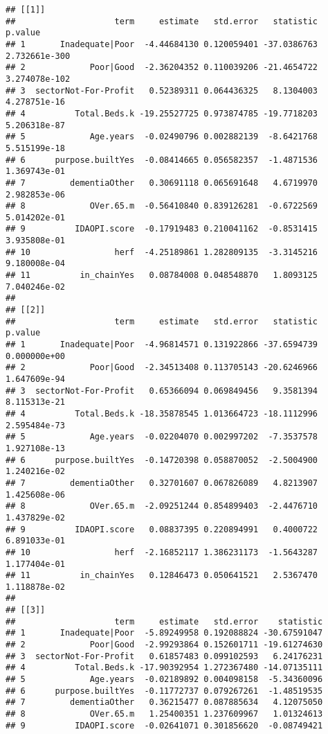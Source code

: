 \documentclass[]{article}
\begin{document}
\begin{verbatim}
## [[1]]
##                    term     estimate   std.error   statistic       p.value
## 1       Inadequate|Poor  -4.44684130 0.120059401 -37.0386763 2.732661e-300
## 2             Poor|Good  -2.36204352 0.110039206 -21.4654722 3.274078e-102
## 3  sectorNot-For-Profit   0.52389311 0.064436325   8.1304003  4.278751e-16
## 4          Total.Beds.k -19.25527725 0.973874785 -19.7718203  5.206318e-87
## 5             Age.years  -0.02490796 0.002882139  -8.6421768  5.515199e-18
## 6      purpose.builtYes  -0.08414665 0.056582357  -1.4871536  1.369743e-01
## 7         dementiaOther   0.30691118 0.065691648   4.6719970  2.982853e-06
## 8             OVer.65.m  -0.56410840 0.839126281  -0.6722569  5.014202e-01
## 9          IDAOPI.score  -0.17919483 0.210041162  -0.8531415  3.935808e-01
## 10                 herf  -4.25189861 1.282809135  -3.3145216  9.180008e-04
## 11          in_chainYes   0.08784008 0.048548870   1.8093125  7.040246e-02
## 
## [[2]]
##                    term     estimate   std.error   statistic      p.value
## 1       Inadequate|Poor  -4.96814571 0.131922866 -37.6594739 0.000000e+00
## 2             Poor|Good  -2.34513408 0.113705143 -20.6246966 1.647609e-94
## 3  sectorNot-For-Profit   0.65366094 0.069849456   9.3581394 8.115313e-21
## 4          Total.Beds.k -18.35878545 1.013664723 -18.1112996 2.595484e-73
## 5             Age.years  -0.02204070 0.002997202  -7.3537578 1.927108e-13
## 6      purpose.builtYes  -0.14720398 0.058870052  -2.5004900 1.240216e-02
## 7         dementiaOther   0.32701607 0.067826089   4.8213907 1.425608e-06
## 8             OVer.65.m  -2.09251244 0.854899403  -2.4476710 1.437829e-02
## 9          IDAOPI.score   0.08837395 0.220894991   0.4000722 6.891033e-01
## 10                 herf  -2.16852117 1.386231173  -1.5643287 1.177404e-01
## 11          in_chainYes   0.12846473 0.050641521   2.5367470 1.118878e-02
## 
## [[3]]
##                    term     estimate   std.error    statistic
## 1       Inadequate|Poor  -5.89249958 0.192088824 -30.67591047
## 2             Poor|Good  -2.99293864 0.152601711 -19.61274630
## 3  sectorNot-For-Profit   0.61857483 0.099102593   6.24176231
## 4          Total.Beds.k -17.90392954 1.272367480 -14.07135111
## 5             Age.years  -0.02189892 0.004098158  -5.34360096
## 6      purpose.builtYes  -0.11772737 0.079267261  -1.48519535
## 7         dementiaOther   0.36215477 0.087885634   4.12075050
## 8             OVer.65.m   1.25400351 1.237609967   1.01324613
## 9          IDAOPI.score  -0.02641071 0.301856620  -0.08749421

\end{verbatim}
\end{document}
